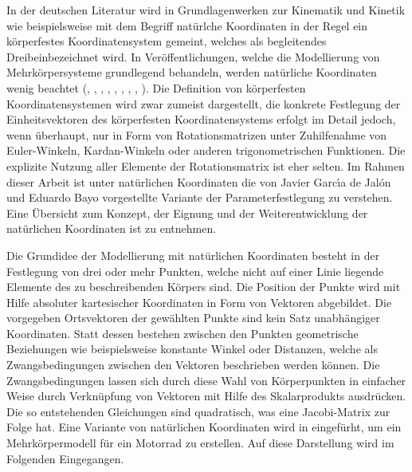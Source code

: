In der deutschen Literatur wird in Grundlagenwerken zur Kinematik und Kinetik wie beispielsweise \cite[S. 6]{Mathiak2015} mit dem Begriff \glqq nat\"urlche Koordinaten\grqq { } in der Regel ein k\"orperfestes Koordinatensystem gemeint, welches als \glqq begleitendes Dreibein\grqq { }bezeichnet wird. In Ver\"offentlichungen, welche die Modellierung von Mehrk\"orpersysteme grundlegend behandeln, werden nat\"urliche Koordinaten wenig beachtet (\cite{Bestle2012}, \cite{GeorgRill2014}, \cite{Schramm2010}, \cite{Gattringer2011}, \cite{Schiehlen2014}, \cite{Pfeiffer2014}, \cite{ManfredHusty2012}, \cite{Wloka1992}, \cite{Woernle2011}). Die Definition von k\"orperfesten Koordinatensystemen wird zwar zumeist dargestellt, die konkrete Festlegung der Einheitsvektoren des k\"orperfesten Koordinatensystems erfolgt im Detail jedoch, wenn \"uberhaupt, nur in Form von Rotationsmatrizen unter Zuhilfenahme von Euler-Winkeln, Kardan-Winkeln oder anderen trigonometrischen Funktionen. Die explizite Nutzung aller Elemente der Rotationsmatrix ist eher selten. \hfill \newline
Im Rahmen dieser Arbeit ist unter nat\"urlichen Koordinaten die von Javier Garc{\'{\i}}a de Jal{\'{o}}n und Eduardo Bayo \cite{Jalon1994} vorgestellte Variante der Parameterfestlegung zu verstehen. Eine \"Ubersicht zum Konzept, der Eignung und der Weiterentwicklung der nat\"urlichen Koordinaten ist \cite{Jalon2007a} zu entnehmen. \hfill \newline

Die Grundidee der Modellierung mit nat\"urlichen Koordinaten besteht in der Festlegung von drei oder mehr Punkten, welche nicht auf einer Linie liegende Elemente des zu beschreibenden K\"orpers sind. Die Position der Punkte wird mit Hilfe absoluter kartesischer Koordinaten in Form von Vektoren abgebildet. Die vorgegeben Ortsvektoren der gew\"ahlten Punkte sind kein Satz unabh\"angiger Koordinaten. Statt dessen bestehen zwischen den Punkten geometrische Beziehungen wie beispielsweise konstante Winkel oder Distanzen, welche als Zwangsbedingungen zwischen den Vektoren beschrieben werden k\"onnen. Die Zwangsbedingungen lassen sich durch diese Wahl von K\"orperpunkten in einfacher Weise durch Verkn\"upfung von Vektoren mit Hilfe des Skalarprodukts ausdr\"ucken. Die so entstehenden Gleichungen sind quadratisch, was eine Jacobi-Matrix zur Folge hat. Eine Variante von nat\"urlichen Koordinaten wird in \cite{Cossalter2002} eingef\"urht, um ein Mehrk\"orpermodell f\"ur ein Motorrad zu erstellen. Auf diese Darstellung wird im Folgenden Eingegangen. \hfill \newline

